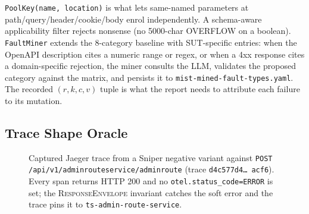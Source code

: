 \documentclass[10pt,conference]{IEEEtran}
\begin{document}
\texttt{PoolKey(name, location)} is what lets same-named parameters at path/query/header/cookie/body enrol independently. A schema-aware applicability filter rejects nonsense (no 5000-char OVERFLOW on a boolean). \texttt{FaultMiner} extends the 8-category baseline with SUT-specific entries: when the OpenAPI description cites a numeric range or regex, or when a 4xx response cites a domain-specific rejection, the miner consults the LLM, validates the proposed category against the matrix, and persists it to \texttt{mist-mined-fault-types.yaml}. The recorded $(r, k, c, v)$ tuple is what the report needs to attribute each failure to its mutation.

\subsection{Trace Shape Oracle}\label{sec:traceoracle}

\begin{figure}[t]
  \centering
  \resizebox{\textwidth}{!}{}
  \caption{Captured Jaeger trace from a Sniper negative variant against \texttt{POST /api/v1/adminrouteservice/adminroute} (trace \texttt{d4c577d4\dots\,acf6}). Every span returns HTTP 200 and no \texttt{otel.status\_code=ERROR} is set; the \textsc{ResponseEnvelope} invariant catches the soft error and the trace pins it to \texttt{ts-admin-route-service}.}
  \label{fig:trace}
\end{figure}
\end{document}
